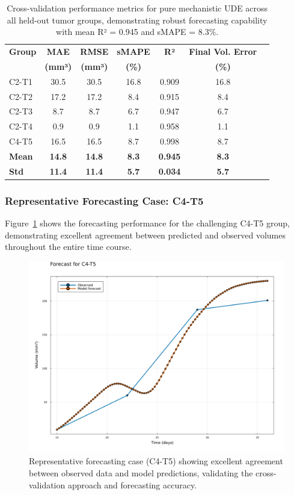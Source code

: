 \documentclass{juliacon}
\begin{document}
\begin{table}[H]\centering
\small
\begin{tabular}{@{}lcccccc@{}}
\toprule
\textbf{Group} & \textbf{MAE} & \textbf{RMSE} & \textbf{sMAPE} & \textbf{R²} & \textbf{Final Vol. Error} \\
& \textbf{(mm³)} & \textbf{(mm³)} & \textbf{(\%)} & & \textbf{(\%)} \\
\midrule
C2-T1 & 30.5 & 30.5 & 16.8 & 0.909 & 16.8 \\
C2-T2 & 17.2 & 17.2 & 8.4 & 0.915 & 8.4 \\
C2-T3 & 8.7 & 8.7 & 6.7 & 0.947 & 6.7 \\
C2-T4 & 0.9 & 0.9 & 1.1 & 0.958 & 1.1 \\
C4-T5 & 16.5 & 16.5 & 8.7 & 0.998 & 8.7 \\
\midrule
\textbf{Mean} & \textbf{14.8} & \textbf{14.8} & \textbf{8.3} & \textbf{0.945} & \textbf{8.3} \\
\textbf{Std} & \textbf{11.4} & \textbf{11.4} & \textbf{5.7} & \textbf{0.034} & \textbf{5.7} \\
\bottomrule
\end{tabular}
\caption{Cross-validation performance metrics for pure mechanistic UDE across all held-out tumor groups, demonstrating robust forecasting capability with mean R² = 0.945 and sMAPE = 8.3\%.}
\label{tab:cv_metrics}
\end{table}

\subsubsection{Representative Forecasting Case: C4-T5}

Figure~\ref{fig:c4t5_forecast} shows the forecasting performance for the challenging C4-T5 group, demonstrating excellent agreement between predicted and observed volumes throughout the entire time course.

\begin{figure}[H]\centering
\includegraphics[width=\linewidth]{forecast_comparison.png}
\caption{Representative forecasting case (C4-T5) showing excellent agreement between observed data and model predictions, validating the cross-validation approach and forecasting accuracy.}
\label{fig:c4t5_forecast}
\end{figure}
\end{document}
